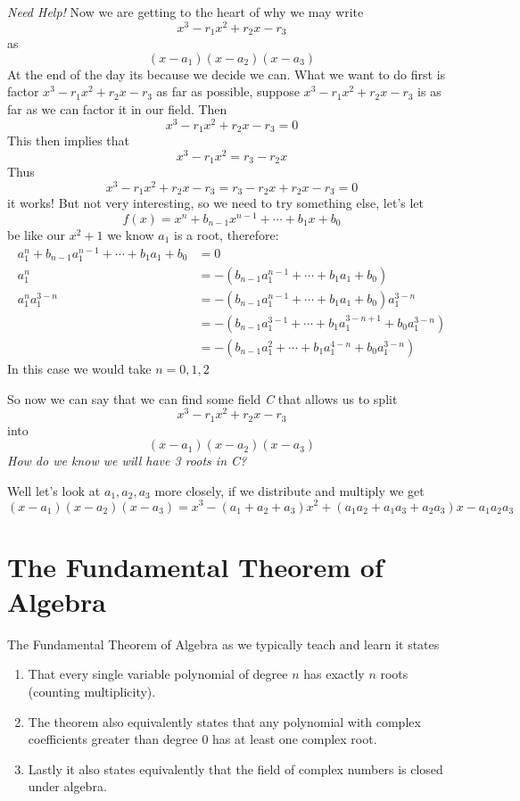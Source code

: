 \documentclass[12pt]{article}
\begin{document}
\emph{Need Help!}
Now we are getting to the heart of why we may write $$x^3 -r_1 x^2 +r_2 x - r_3$$ as $$(x-a_1)(x-a_2)(x-a_3)$$  At the end of the day its because we decide we can.  What we want to do first is factor $x^3 -r_1 x^2 +r_2 x - r_3$ as far as possible, suppose $x^3 -r_1 x^2 +r_2 x - r_3$ is as far as we can factor it in our field.   Then $$x^3 -r_1 x^2 +r_2 x - r_3 =0$$
This then implies that $$x^3 -r_1 x^2 = r_3- r_2 x$$
Thus $$x^3 -r_1 x^2 +r_2 x - r_3 = r_3- r_2 x +r_2 x - r_3 = 0$$ it works!  But not very interesting, so we need to try something else, let's let $$f(x) = x^n + b_{n-1}x^{n-1} + \cdots + b_1 x + b_0$$ be like our $x^2+1$ we know $a_1$ is a root, therefore:
\begin{align*}
a_1^n + b_{n-1}a_1^{n-1} + \cdots + b_1 a_1 + b_0 &=0 \\
a_1^n  &= -(b_{n-1}a_1^{n-1} + \cdots + b_1 a_1 + b_0) \\
a_1^na_1^{3-n} &= -(b_{n-1}a_1^{n-1} + \cdots + b_1 a_1 + b_0)a_1^{3-n} \\
&= -(b_{n-1}a_1^{3-1} + \cdots + b_1 a_1^{3-n+1} + b_0 a_1^{3-n}) \\
&= -(b_{n-1}a_1^{2} + \cdots + b_1 a_1^{4-n} + b_0 a_1^{3-n})
\end{align*}
In this case we would take $n=0,1,2$



So now we can say that we can find some field \emph{C} that allows us to split $$x^3 -r_1 x^2 +r_2 x - r_3$$ into $$(x-a_1)(x-a_2)(x-a_3)$$ \emph{How do we know we will have 3 roots in C?}


Well let's look at $a_1, a_2, a_3$ more closely, if we distribute and multiply we get
$$ (x-a_1)(x-a_2)(x-a_3) = x^3 -(a_1+a_2+a_3)x^2+(a_1a_2 +a_1a_3 +a_2a_3)x -a_1a_2a_3$$


\section*{The Fundamental Theorem of Algebra}
The Fundamental Theorem of Algebra as we typically teach and learn it states 
\begin{enumerate}
\item That every single variable polynomial of degree $n$ has exactly $n$ roots (counting multiplicity).
\item The theorem also equivalently states that any polynomial with complex coefficients greater than degree 0 has at least one complex root.  
\item Lastly it also states equivalently that the field of complex numbers is closed under algebra.
\end{enumerate}
\end{document}
